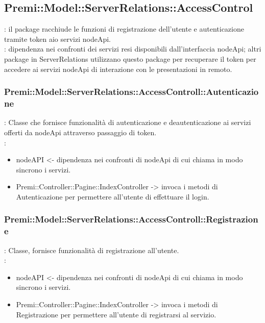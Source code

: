 \subsection{Premi::Model::ServerRelations::AccessControl}{
		\textbf{\tipo}: il package racchiude le funzioni di registrazione dell’utente e autenticazione tramite token aio servizi nodeApi.\\
		\textbf{\relaz}: dipendenza nei confronti dei servizi resi disponibili dall’interfaccia nodeApi; altri package in ServerRelations utilizzano questo package per recuperare il token per accedere ai servizi nodeApi di interazione con le presentazioni in remoto.\\
        \subsubsection{Premi::Model::ServerRelations::AccessControll::Autenticazione}{
				\textbf{\tipo}: Classe che fornisce funzionalità di autenticazione e deautenticazione ai servizi offerti da nodeApi attraverso passaggio di token.\\	
				\textbf{\relaz}: 
				\begin{itemize}
					\item nodeAPI <- dipendenza nei confronti di nodeApi di cui chiama in modo sincrono i servizi.
                    \item Premi::Controller::Pagine::IndexController -> invoca i metodi di Autenticazione per permettere all'utente di effettuare il login.
				\end{itemize}	
                    }
        \subsubsection{Premi::Model::ServerRelations::AccessControll::Registrazione}{
				\textbf{\tipo}: Classe, fornisce funzionalità di registrazione all’utente.\\	
				\textbf{\relaz}: 
				\begin{itemize}
					\item nodeAPI <- dipendenza nei confronti di nodeApi di cui chiama in modo sincrono i servizi.
                    \item Premi::Controller::Pagine::IndexController -> invoca i metodi di Registrazione per permettere all'utente di registrarsi al servizio.
				\end{itemize}	
            }
}

